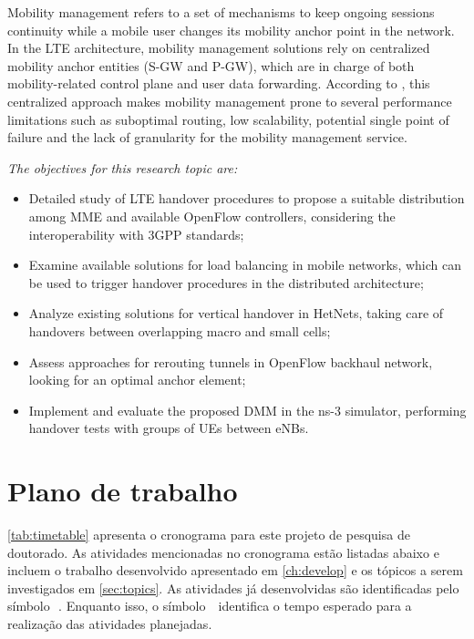 Mobility management refers to a set of mechanisms to keep ongoing sessions
continuity while a mobile user changes its mobility anchor point in the
network. In the \ac{LTE} architecture, mobility management solutions rely on
centralized mobility anchor entities (\ac{S-GW} and \ac{P-GW}), which are in
charge of both mobility-related control plane and user data forwarding.
According to \citet{Valtulina2014}, this centralized approach makes mobility
management prone to several performance limitations such as suboptimal
routing, low scalability, potential single point of failure and the lack of
granularity for the mobility management service.

\emph{The objectives for this research topic are:}
\begin{itemize}
  \item Detailed study of \ac{LTE} handover procedures to propose a suitable
  distribution among \ac{MME} and available OpenFlow controllers, considering
  the interoperability with \ac{3GPP} standards;

  \item Examine available solutions for load balancing in mobile networks,
  which can be used to trigger handover procedures in the distributed
  architecture;

  \item Analyze existing solutions for vertical handover in \acp{HetNet},
  taking care of handovers between overlapping macro and small cells;

  \item Assess approaches for rerouting tunnels in OpenFlow backhaul network,
  looking for an optimal anchor element;

  \item Implement and evaluate the proposed \ac{DMM} in the \ac{ns-3}
  simulator, performing handover tests with groups of \acp{UE} between
  \acp{eNB}.
\end{itemize}

\clearpage
\section{Plano de trabalho}
\label{sec:timetable}

\autoref{tab:timetable} apresenta o cronograma para este projeto de pesquisa de doutorado. As atividades mencionadas no cronograma estão listadas abaixo e incluem o trabalho desenvolvido apresentado em \autoref{ch:develop} e os tópicos a serem investigados em \autoref{sec:topics}. As atividades já desenvolvidas são identificadas pelo símbolo~\,\m. Enquanto isso, o símbolo \,\x\ identifica o tempo esperado para a realização das atividades planejadas.

